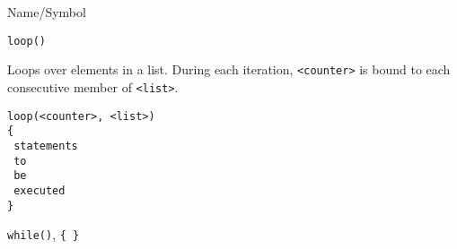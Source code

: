 \begin{desc}{Name/Symbol}
\item[Name/Symbol]	\verb+loop()+

\item[Description]	Loops over elements in a list.  During each iteration, \verb+<counter>+ is bound to each consecutive member of \verb+<list>+.

\item[Usage]		
\begin{verbatim}
loop(<counter>, <list>)
{
 statements
 to
 be	   
 executed
}
\end{verbatim}

\item[Example]	

\item[See Also]	\verb+while()+, \verb+{ }+
\end{desc}

\vfill
\newpage
{}
\vfill


